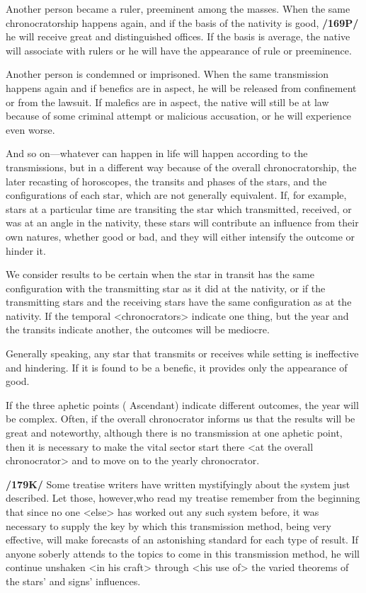 Another person became a ruler, preeminent among the masses. When the same chronocratorship happens again, and if the basis of the nativity is good, \textbf{/169P/} he will receive great and distinguished offices. If the basis is average, the native will associate with rulers or he will have the appearance of rule or preeminence.

Another person is condemned or imprisoned. When the same transmission happens again and if benefics are in aspect, he will be released from confinement or from the lawsuit. If malefics are in aspect, the native will still be at law because of some criminal attempt or malicious accusation, or he will experience even worse.

And \mndl so on—whatever can happen in life will happen according to the transmissions, but in a different way because of the overall chronocratorship, the later recasting of horoscopes, the transits and phases of the stars, and the configurations of each star, which are not generally equivalent. If, for example, stars at a particular time are transiting the star which transmitted, received, or was at an angle in the nativity, these stars will contribute an influence from their own natures, whether good or bad, and they will either intensify the outcome or hinder it. 

We consider results to be certain when the star in transit has the same configuration with the transmitting star as it did at the nativity, or if the transmitting stars and the receiving stars have the same configuration as at the nativity. If the temporal <chronocrators> indicate one thing, but the year and the transits indicate another, the outcomes will be mediocre. 

Generally \mndl speaking, any star that transmits or receives while setting is ineffective and hindering. If it is found to be a benefic, it provides only the appearance of good. 

If the three aphetic points (\Sun\xspace \Moon\xspace Ascendant) indicate different outcomes, the year will be complex. Often, if the overall chronocrator informs us that the results will be great and noteworthy, although there is no transmission at one aphetic point, then it is necessary to make the vital sector start there <at the overall chronocrator> and to move on to the yearly chronocrator.

\textbf{/179K/} Some treatise writers have written mystifyingly about the system just described. Let those,
however,who read my treatise remember from the beginning that since no one <else> has worked out any such system before, it was necessary to supply the key by which this transmission method, being very effective, will make forecasts of an astonishing standard for each type of result. If anyone soberly attends to the topics to come in this transmission method, he will continue unshaken <in his craft> through <his use of> the varied theorems of the stars’ and signs’ influences.

\newpage